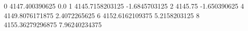 0 4147.400390625 0.0
1 4145.7158203125 -1.6845703125
2 4145.75 -1.650390625
4 4149.8076171875 2.4072265625
6 4152.6162109375 5.2158203125
8 4155.36279296875 7.96240234375
